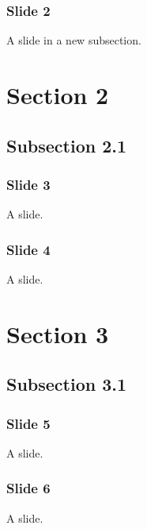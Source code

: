 \documentclass[t,english]{beamer}
\begin{document}
\begin{frame}[fragile]
\frametitle{Slide 2}


A slide in a new subsection.
\end{frame}



\section*{Section 2}



\subsection*{Subsection 2.1}

\begin{frame}[fragile]
\frametitle{Slide 3}


A slide.
\end{frame}

\begin{frame}[fragile]
\frametitle{Slide 4}


A slide.
\end{frame}



\section*{Section 3}



\subsection*{Subsection 3.1}

\begin{frame}[fragile]
\frametitle{Slide 5}


A slide.
\end{frame}

\begin{frame}[fragile]
\frametitle{Slide 6}


A slide.
\end{frame}
\end{document}
